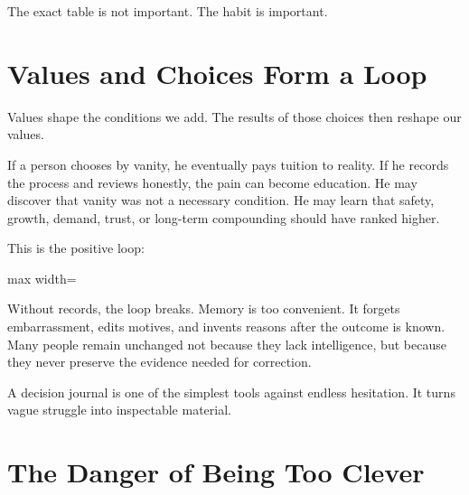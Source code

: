 The exact table is not important. The habit is important.

\section*{Values and Choices Form a Loop}

Values shape the conditions we add. The results of those choices then reshape our values.

If a person chooses by vanity, he eventually pays tuition to reality. If he records the process and reviews honestly, the pain can become education. He may discover that vanity was not a necessary condition. He may learn that safety, growth, demand, trust, or long-term compounding should have ranked higher.

This is the positive loop:

\begin{center}
\begin{adjustbox}{max width=\linewidth}
\end{adjustbox}
\end{center}

Without records, the loop breaks. Memory is too convenient. It forgets embarrassment, edits motives, and invents reasons after the outcome is known. Many people remain unchanged not because they lack intelligence, but because they never preserve the evidence needed for correction.

A decision journal is one of the simplest tools against endless hesitation. It turns vague struggle into inspectable material.

\section*{The Danger of Being Too Clever}

